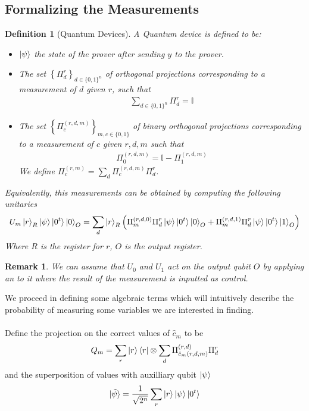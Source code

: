 \documentclass{article}
\newtheorem{definition}{Definition}
\newtheorem{remark}{Remark}
\begin{document}
\subsection{Formalizing the Measurements}
\begin{definition}[Quantum Devices]
A Quantum device is defined to be:
\begin{itemize}
    \item $\ket{\psi}$ the state of the prover after sending $y$ to the prover.
    \item The set $\left\{\Pi_{d}^{r}\right\}_{d\in \{0,1\}^{n}}$ of orthogonal projections corresponding to a measurement of $d$ given $r$, such that \begin{align}
        \sum_{d\in\{0,1\}^{n}}\Pi_{d}^{r} = \mathbb{I}
    \end{align} 
    \item The set $\left\{\Pi^{(r,d,m)}_{c}\right\}_{m,c\in \{0,1\}}$ of binary orthogonal projections corresponding to a measurement of $c$ given $r, d, m$ such that \begin{align}
        \Pi_{0}^{(r,d,m)} = \mathbb{I} - \Pi_{1}^{(r,d,m)}
    \end{align}  We define $\Pi^{(r,m)}_{c} = \sum_{d} \Pi_{c}^{(r,d,m)}\Pi_{d}^{r}$. 
\end{itemize}
Equivalently, this measurements can be obtained by computing the following unitaries \begin{align}U_{m}\ket{r}_{R}\ket{\psi}\ket{0^{t}}\ket{0}_{O} = \sum_{d}\ket{r}_{R}\left(\Pi_{m}^{(r,d,0)}\Pi_{d}^{r}\ket{\psi}\ket{0^{t}}\ket{0}_{O}+\Pi_{m}^{(r,d,1)}\Pi_{d}^{r}\ket{\psi}\ket{0^{t}}\ket{1}_{O}\right)\end{align} Where $R$ is the register for $r$, $O$ is the output register.
\end{definition}
\begin{remark}
We can assume that $U_{0}$ and $U_{1}$ act on the output qubit $O$ by applying an  to it where the result of the measurement is inputted as control.
\end{remark} We proceed in defining some algebraic terms which will intuitively describe the probability of measuring some variables we are interested in finding.
\\\\Define the projection on the correct values of $\hat{c}_{m}$ to be
\begin{align}Q_{m}=\sum_{r}\ket{r}\bra{r}\otimes \sum_{d}\Pi_{\hat{c}_{m}(r,d,m)}^{(r,d)}\Pi_{d}^{r}\end{align} and the superposition of values with auxilliary qubit $\ket{\psi}$ \begin{align}\ket{\tilde{\psi}}=\frac{1}{\sqrt{2^{n}}}\sum_{r}\ket{r}\ket{\psi}\ket{0^{t}}\end{align}
\end{document}
